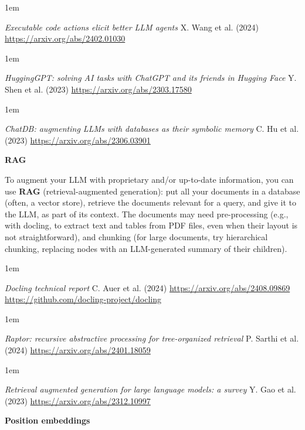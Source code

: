 \documentclass[a5paper]{article}
\let\d\textbf
\newenvironment{reference}{%
  \medskip\goodbreak
  \parskip 0pt
  \raggedright
  \leftskip 1em
  \obeylines
}{\par\medskip\goodbreak}
\def\subsection#1{{\par\bigskip\goodbreak\large\bfseries #1\par}}
\begin{document}
\begin{reference}
  \emph{Executable code actions  elicit better LLM agents}
  X. Wang et al. (2024)
  \url{https://arxiv.org/abs/2402.01030}
\end{reference}

\begin{reference}
  \emph{HuggingGPT: solving AI tasks with ChatGPT and its friends in Hugging Face}
  Y. Shen et al. (2023)
  \url{https://arxiv.org/abs/2303.17580}
\end{reference}

\begin{reference}
  \emph{ChatDB: augmenting LLMs  with databases as their symbolic memory}
  C. Hu et al. (2023)
  \url{https://arxiv.org/abs/2306.03901}
\end{reference}

\subsection{RAG}

To augment your LLM with proprietary and/or up-to-date information,
you can use \d{RAG} (retrieval-augmented generation): put all your documents
in a database (often, a vector store), retrieve the documents relevant for a query,
and give it to the LLM, as part of its context.
The documents may need pre-processing (e.g., with docling,
to extract text and tables from PDF files, even when their layout is not straightforward),
and chunking (for large documents, try hierarchical chunking,
replacing nodes with an LLM-generated summary of their children).

\begin{reference}
  \emph{Docling technical report}
  C. Auer et al. (2024)
  \url{https://arxiv.org/abs/2408.09869}
  \url{https://github.com/docling-project/docling}
\end{reference}

\begin{reference}
  \emph{Raptor: recursive abstractive processing  for tree-organized retrieval}
  P. Sarthi et al. (2024)
  \url{https://arxiv.org/abs/2401.18059}
\end{reference}

\begin{reference}
  \emph{Retrieval augmented generation  for large language models: a survey}
  Y. Gao et al. (2023)
  \url{https://arxiv.org/abs/2312.10997}
\end{reference}

\subsection{Position embeddings}
\end{document}
